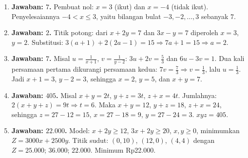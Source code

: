 \documentclass[a4paper,11pt]{article}
\newcounter{no}
\begin{document}
\small\begin{enumerate}[leftmargin=2em,itemsep=2pt,topsep=2pt]
\item[\textbf{1.}] \textbf{Jawaban: $7$.} Pembuat nol: $x=3$ (ikut) dan $x=-4$ (tidak ikut). Penyelesaiannya $-4<x\le3$, yaitu bilangan bulat $-3,-2,\dots,3$ sebanyak $7$.
\item[\textbf{2.}] \textbf{Jawaban: $2$.} Titik potong: dari $x+2y=7$ dan $3x-y=7$ diperoleh $x=3$, $y=2$. Substitusi: $3(a+1)+2(2a-1)=15\Rightarrow7a+1=15\Rightarrow a=2$.
\item[\textbf{3.}] \textbf{Jawaban: $7$.} Misal $u=\frac1{x+1}$, $v=\frac1{y-2}$: $3u+2v=\frac53$ dan $6u-3v=1$. Dua kali persamaan pertama dikurangi persamaan kedua: $7v=\frac73\Rightarrow v=\frac13$, lalu $u=\frac13$. Jadi $x+1=3$, $y-2=3$, sehingga $x=2$, $y=5$, dan $x+y=7$.
\item[\textbf{4.}] \textbf{Jawaban: $405$.} Misal $x+y=2t$, $y+z=3t$, $z+x=4t$. Jumlahnya: $2(x+y+z)=9t\Rightarrow t=6$. Maka $x+y=12$, $y+z=18$, $z+x=24$, sehingga $z=27-12=15$, $x=27-18=9$, $y=27-24=3$. $xyz=405$.
\item[\textbf{5.}] \textbf{Jawaban: $22.000$.} Model: $x+2y\ge12$, $3x+2y\ge20$, $x,y\ge0$, minimumkan $Z=3000x+2500y$. Titik sudut: $(0,10)$, $(12,0)$, $(4,4)$ dengan $Z=25.000$; $36.000$; $22.000$. Minimum Rp22.000.
\end{enumerate}
\par{}\par\vspace{0.2em}
\end{document}
